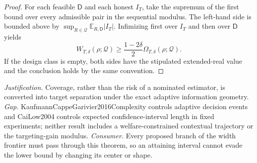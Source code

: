 \documentclass{article}
\begin{document}
\begin{proof}
For each feasible \(\mathsf D\) and each honest \(I_T\), take the supremum of the first bound over every admissible pair in the sequential modulus.  The left-hand side is bounded above by \(\sup_{R\in\mathcal Q}\mathbb E_{R,\mathsf D}|I_T|\).  Infimizing first over \(I_T\) and then over \(\mathsf D\) yields
\[
W_{T,\delta}(\rho;\mathcal Q)
\geq\frac{1-2\delta}{2}\Omega_{T,\delta}(\rho;\mathcal Q).
\]
If the design class is empty, both sides have the stipulated extended-real value and the conclusion holds by the same convention.
\end{proof}
\par\smallskip\noindent \textit{Justification.} Coverage, rather than the risk of a nominated estimator, is converted into target separation under the exact adaptive information geometry. \textit{Gap.} KaufmannCappeGarivier2016Complexity controls adaptive decision events and CaiLow2004 controls expected confidence-interval length in fixed experiments; neither result includes a welfare-constrained contextual trajectory or the targeting-gain modulus. \textit{Consumer.} Every proposed branch of the width frontier must pass through this theorem, so an attaining interval cannot evade the lower bound by changing its center or shape.
\end{document}

